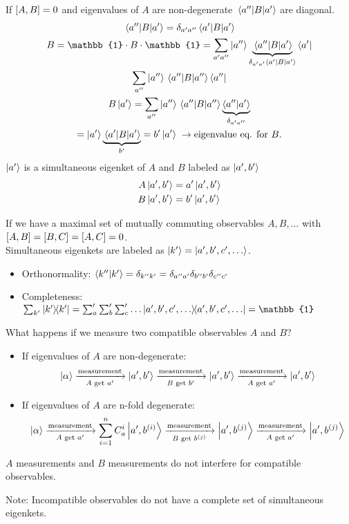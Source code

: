 \begin{frame}
	If $\comm{A}{B} = 0$ and eigenvalues of $A$ are non-degenerate $ \mel{a''}{B}{a'} $ are diagonal.
	\begin{gather*}
		\mel{a''}{B}{a'}  = \delta_{a'a''} \ev{B}{a'}\\
		B = \mathbb{1}\cdot B \cdot \mathbb{1} = \sum_{a' a''} \ket{a''} \underbrace{\mel{a''}{B}{a'} }_{\delta_{a'a'} \ev{B}{a'}}\bra{a'}\\
		\sum_{a''}\ket{a''}\mel{a''}{B}{a''} \bra{a''}\\
		B\ket{a'} = \sum_{a''} \ket{a''}\mel{a''}{B}{a''}\underbrace{\ip{a''}{a'}}_{\delta_{a'a''}}\\
		= \ket{a'} \underbrace{\mel{a'}{B}{a'}}_{b'} = b'\ket{a'} \; \to \text{eigenvalue eq. for }B.
	\end{gather*}
	$\ket{a'}$ is a simultaneous eigenket of $A$ and $B$ labeled as $\ket{a',b'}$
	\begin{align*}
		A\ket{a',b'} & =a'\ket{a',b'} \\
		B\ket{a',b'} & =b'\ket{a',b'}
	\end{align*}
\end{frame}

\begin{frame}
	If we have a maximal set of mutually commuting observables $A,B,\dots$ with $\comm{A}{B}=\comm{B}{C}=\comm{A}{C}= 0$.\\
	Simultaneous eigenkets are labeled as $\ket{k'} = \ket{a',b',c',\dots}$.
	\begin{itemize}
		\item Orthonormality: $\ip{k''}{k'} = \delta_{k''k'}=\delta_{a''a'}\delta_{b''b'}\delta_{c''c'}$
		\item Completeness: $\sum_{k'}\op{k'} = \sum_a' \sum_b' \sum_c' \dots \op{a',b',c',\dots} = \mathbb{1}$
	\end{itemize}
\end{frame}

\begin{frame}{What happens if we measure two compatible observables $A$ and $B$?}
	\begin{itemize}
		\item If eigenvalues of $A$ are non-degenerate:
		      \[
			      \ket{\alpha} \xrightarrow[A \text{ get } a']{\text{measurement}} \ket{a',b'} \xrightarrow[B \text{ get } b']{\text{measurement}} \ket{a',b'}\xrightarrow[A \text{ get } a']{\text{measurement}}\ket{a',b'}
		      \]
		\item If eigenvalues of $A$ are n-fold degenerate:
		      \[
			      \ket{\alpha} \xrightarrow[A \text{ get } a']{\text{measurement}} \sum_{i=1}^n C_{a}^{i}\ket{a',b^{(i)}} \xrightarrow[B \text{ get } b^{(j)}]{\text{measurement}} \ket{a',b^{(j)}}\xrightarrow[A \text{ get } a']{\text{measurement}}\ket{a',b^{(j)}}
		      \]
	\end{itemize}

	$A$ measurements and $B$ measurements do not interfere for compatible observables.

	Note: Incompatible observables do not have a complete set of simultaneous eigenkets.
\end{frame}

